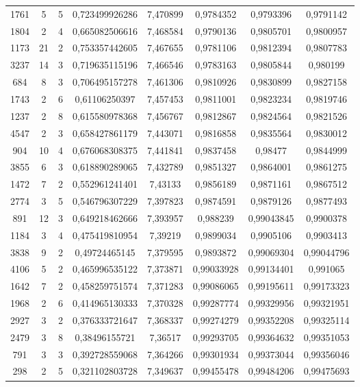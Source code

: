 \begin{longtable}{|c|c|c|c|c|c|c|c|}
1761 & 5 & 5 & 0,723499926286 & 7,470899 & 0,9784352 & 0,9793396 & 0,9791142 \\
1804 & 2 & 4 & 0,665082506616 & 7,468584 & 0,9790136 & 0,9805701 & 0,9800957 \\
1173 & 21 & 2 & 0,753357442605 & 7,467655 & 0,9781106 & 0,9812394 & 0,9807783 \\
3237 & 14 & 3 & 0,719635115196 & 7,466546 & 0,9783163 & 0,9805844 & 0,980199 \\
684 & 8 & 3 & 0,706495157278 & 7,461306 & 0,9810926 & 0,9830899 & 0,9827158 \\
1743 & 2 & 6 & 0,61106250397 & 7,457453 & 0,9811001 & 0,9823234 & 0,9819746 \\
1237 & 2 & 8 & 0,615580978368 & 7,456767 & 0,9812867 & 0,9824564 & 0,9821526 \\
4547 & 2 & 3 & 0,658427861179 & 7,443071 & 0,9816858 & 0,9835564 & 0,9830012 \\
904 & 10 & 4 & 0,676068308375 & 7,441841 & 0,9837458 & 0,98477 & 0,9844999 \\
3855 & 6 & 3 & 0,618890289065 & 7,432789 & 0,9851327 & 0,9864001 & 0,9861275 \\
1472 & 7 & 2 & 0,552961241401 & 7,43133 & 0,9856189 & 0,9871161 & 0,9867512 \\
2774 & 3 & 5 & 0,546796307229 & 7,397823 & 0,9874591 & 0,9879126 & 0,9877493 \\
891 & 12 & 3 & 0,649218462666 & 7,393957 & 0,988239 & 0,99043845 & 0,9900378 \\
1184 & 3 & 4 & 0,475419810954 & 7,39219 & 0,9899034 & 0,9905106 & 0,9903413 \\
3838 & 9 & 2 & 0,49724465145 & 7,379595 & 0,9893872 & 0,99069304 & 0,99044796 \\
4106 & 5 & 2 & 0,465996535122 & 7,373871 & 0,99033928 & 0,99134401 & 0,991065 \\
1642 & 7 & 2 & 0,458259751574 & 7,371283 & 0,99086065 & 0,99195611 & 0,99173323 \\
1968 & 2 & 6 & 0,414965130333 & 7,370328 & 0,99287774 & 0,99329956 & 0,99321951 \\
2927 & 3 & 2 & 0,376333721647 & 7,368337 & 0,99274279 & 0,99352208 & 0,99325114 \\
2479 & 3 & 8 & 0,38496155721 & 7,36517 & 0,99293705 & 0,99364632 & 0,99351053 \\
791 & 3 & 3 & 0,392728559068 & 7,364266 & 0,99301934 & 0,99373044 & 0,99356046 \\
298 & 2 & 5 & 0,321102803728 & 7,349637 & 0,99455478 & 0,99484206 & 0,99475693 \\

\end{longtable}
